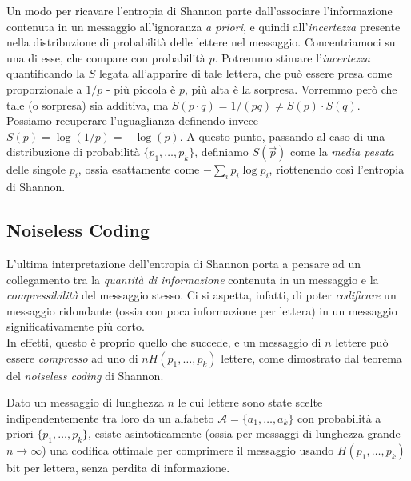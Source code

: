 \documentclass[../../InformazioneQuantistica.tex]{subfiles}
\begin{document}
\begin{expl}
Un modo  \cite{relative-entropy} per ricavare l'entropia di Shannon parte dall'associare l'informazione contenuta in un messaggio all'ignoranza \textit{a priori}, e quindi all'\textit{incertezza} presente nella distribuzione di probabilità delle lettere nel messaggio. Concentriamoci su una di esse, che compare con probabilità $p$. Potremmo stimare l'\textit{incertezza} quantificando la  $S$ legata all'apparire di tale lettera, che può essere presa come proporzionale a $1/p$ - più piccola è $p$, più alta è la sorpresa. Vorremmo però che tale  (o sorpresa) sia additiva, ma $S(p\cdot q) = 1/(pq) \neq S(p) \cdot S(q)$. Possiamo recuperare l'uguaglianza definendo invece $S(p) = \log (1/p) = -\log(p)$. A questo punto, passando al caso di una distribuzione di probabilità $\{p_1, \dots, p_k\}$, definiamo $S(\vec{p})$ come la \textit{media pesata} delle singole  $p_i$, ossia esattamente come $-\sum_i p_i \log p_i$, riottenendo così l'entropia di Shannon.
\end{expl}

\subsection{Noiseless Coding}
L'ultima interpretazione dell'entropia di Shannon porta a pensare ad un collegamento tra la \textit{quantità di informazione} contenuta in un messaggio e la \textit{compressibilità} del messaggio stesso. Ci si aspetta, infatti, di poter \textit{codificare} un messaggio ridondante (ossia con poca informazione per lettera) in un messaggio significativamente più corto.\\ 
In effetti, questo è proprio quello che succede, e un messaggio di $n$ lettere può essere \textit{compresso} ad uno di $nH(p_1, \dots, p_k)$ lettere, come dimostrato dal teorema del \textit{noiseless coding} di Shannon. 

\begin{thm} 
Dato un messaggio di lunghezza $n$ le cui lettere sono state scelte indipendentemente tra loro da un alfabeto $\mathcal{A} = \{a_1, \dots, a_k\}$ con probabilità a priori $\{p_1, \dots, p_k\}$, esiste asintoticamente (ossia per messaggi di lunghezza grande $n\to \infty$) una codifica ottimale per comprimere il messaggio usando $H(p_1,\dots, p_k)$ bit per lettera, senza perdita di informazione.
\end{thm}
\end{document}
